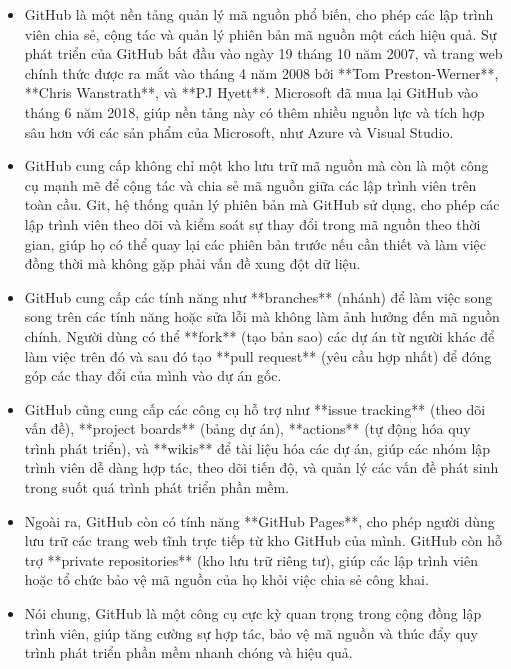 \begin{itemize}
\item GitHub là một nền tảng quản lý mã nguồn phổ biến, cho phép các lập trình viên chia sẻ, cộng tác và quản lý phiên bản mã nguồn một cách hiệu quả. Sự phát triển của GitHub bắt đầu vào ngày 19 tháng 10 năm 2007, và trang web chính thức được ra mắt vào tháng 4 năm 2008 bởi **Tom Preston-Werner**, **Chris Wanstrath**, và **PJ Hyett**. Microsoft đã mua lại GitHub vào tháng 6 năm 2018, giúp nền tảng này có thêm nhiều nguồn lực và tích hợp sâu hơn với các sản phẩm của Microsoft, như Azure và Visual Studio. 

\item GitHub cung cấp không chỉ một kho lưu trữ mã nguồn mà còn là một công cụ mạnh mẽ để cộng tác và chia sẻ mã nguồn giữa các lập trình viên trên toàn cầu. Git, hệ thống quản lý phiên bản mà GitHub sử dụng, cho phép các lập trình viên theo dõi và kiểm soát sự thay đổi trong mã nguồn theo thời gian, giúp họ có thể quay lại các phiên bản trước nếu cần thiết và làm việc đồng thời mà không gặp phải vấn đề xung đột dữ liệu.

\item GitHub cung cấp các tính năng như **branches** (nhánh) để làm việc song song trên các tính năng hoặc sửa lỗi mà không làm ảnh hưởng đến mã nguồn chính. Người dùng có thể **fork** (tạo bản sao) các dự án từ người khác để làm việc trên đó và sau đó tạo **pull request** (yêu cầu hợp nhất) để đóng góp các thay đổi của mình vào dự án gốc.

\item GitHub cũng cung cấp các công cụ hỗ trợ như **issue tracking** (theo dõi vấn đề), **project boards** (bảng dự án), **actions** (tự động hóa quy trình phát triển), và **wikis** để tài liệu hóa các dự án, giúp các nhóm lập trình viên dễ dàng hợp tác, theo dõi tiến độ, và quản lý các vấn đề phát sinh trong suốt quá trình phát triển phần mềm.

\item Ngoài ra, GitHub còn có tính năng **GitHub Pages**, cho phép người dùng lưu trữ các trang web tĩnh trực tiếp từ kho GitHub của mình. GitHub còn hỗ trợ **private repositories** (kho lưu trữ riêng tư), giúp các lập trình viên hoặc tổ chức bảo vệ mã nguồn của họ khỏi việc chia sẻ công khai.

\item Nói chung, GitHub là một công cụ cực kỳ quan trọng trong cộng đồng lập trình viên, giúp tăng cường sự hợp tác, bảo vệ mã nguồn và thúc đẩy quy trình phát triển phần mềm nhanh chóng và hiệu quả.
\end{itemize}


